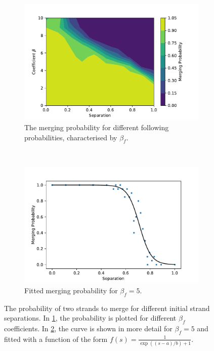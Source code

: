 \documentclass[11pt]{article}
\begin{document}
\begin{figure}[H]
    \centering %
    \begin{subfigure}[t]{.6\textwidth}
    \includegraphics[width = \linewidth]{img/contourtest.pdf}
    \caption{The merging probability for different following probabilities, characterised by $\beta_f$.}\label{sfig:2dconv}
    \end{subfigure}
    ~
    \begin{subfigure}[t]{.6\textwidth}
    \includegraphics[width = \linewidth]{img/beta5.pdf}
    \caption{Fitted merging probability for $\beta_f = 5$.}\label{sfig:fitconv}
    \end{subfigure}
    \caption{The probability of two strands to merge for different initial strand separations. In \ref{sfig:2dconv}, the probability is plotted for different $\beta_f$ coefficients. In \ref{sfig:fitconv}, the curve is shown in more detail for $\beta_f = 5$ and fitted with a function of the form $f(s) = \frac{1}{\exp((s-a)/b) + 1}$.}
    \label{fig:convProb}
\end{figure}
\end{document}
